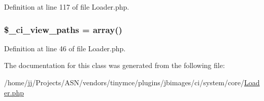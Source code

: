 Definition at line 117 of file Loader.\+php.

\subsubsection[{\texorpdfstring{\$\+\_\+ci\+\_\+view\+\_\+paths}{$_ci_view_paths}}]{\setlength{\rightskip}{0pt plus 5cm}\$\+\_\+ci\+\_\+view\+\_\+paths = array()\hspace{0.3cm}{\ttfamily [protected]}}\hypertarget{class_c_i___loader_adc48c64c673b28c2447ea4214a27eeea}{}\label{class_c_i___loader_adc48c64c673b28c2447ea4214a27eeea}


Definition at line 46 of file Loader.\+php.



The documentation for this class was generated from the following file\+:\begin{DoxyCompactItemize}
\item 
/home/jj/\+Projects/\+A\+S\+N/vendors/tinymce/plugins/jbimages/ci/system/core/\hyperlink{_loader_8php}{Loader.\+php}\end{DoxyCompactItemize}
